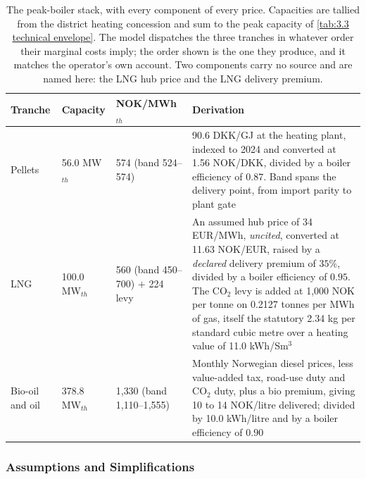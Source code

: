 \begin{table}[h]
\centering
\caption{The peak-boiler stack, with every component of every price. Capacities are tallied from the district heating concession \cite{nve_konsesjonssak_2026} and sum to the peak capacity of \autoref{tab:3.3 technical envelope}. The model dispatches the three tranches in whatever order their marginal costs imply; the order shown is the one they produce, and it matches the operator's own account. Two components carry no source and are named here: the LNG hub price and the LNG delivery premium.}
\small
\begin{tabular}{p{2.0cm} p{1.5cm} p{2.0cm} p{7.6cm}}
\toprule
\textbf{Tranche} & \textbf{Capacity} & \textbf{NOK/MWh$_{th}$} & \textbf{Derivation} \\
\midrule
Pellets & 56.0 MW$_{th}$ & 574 \newline (band 524--574) & 90.6 DKK/GJ at the heating plant, indexed to 2024 and converted at 1.56 NOK/DKK, divided by a boiler efficiency of $0.87$. Band spans the delivery point, from import parity to plant gate \\
\addlinespace
LNG & 100.0 MW$_{th}$ & 560 \newline (band 450--700) \newline $+$ 224 levy & An assumed hub price of 34 EUR/MWh, \emph{uncited}, converted at 11.63 NOK/EUR, raised by a \emph{declared} delivery premium of $35\%$, divided by a boiler efficiency of $0.95$. The CO$_2$ levy is added at 1{,}000 NOK per tonne on 0.2127 tonnes per MWh of gas, itself the statutory 2.34 kg per standard cubic metre over a heating value of 11.0 kWh/Sm$^3$ \\
\addlinespace
Bio-oil and oil & 378.8 MW$_{th}$ & 1{,}330 \newline (band 1{,}110--1{,}555) & Monthly Norwegian diesel prices, less value-added tax, road-use duty and CO$_2$ duty, plus a bio premium, giving 10 to 14 NOK/litre delivered; divided by 10.0 kWh/litre and by a boiler efficiency of $0.90$ \\
\bottomrule
\end{tabular}
\label{tab:3.4.2 peak stack}
\end{table}

\subsubsection{Assumptions and Simplifications}
\label{3-subsec:3.4.3 assumptions}

